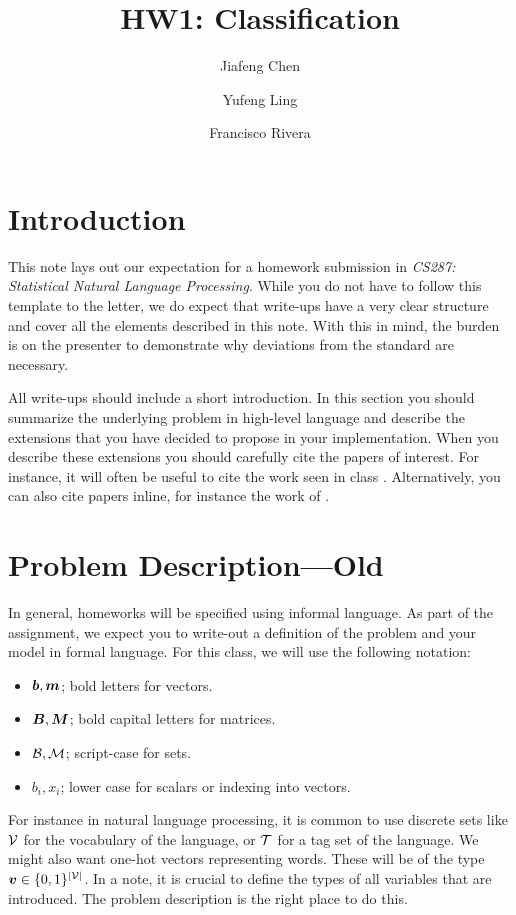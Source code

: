 \documentclass[11pt]{article}
\title{HW1: Classification}
\author{Jiafeng Chen \and Yufeng Ling \and Francisco Rivera}
\begin{document}
\maketitle{}
\section{Introduction}

This note lays out our expectation for a homework submission in
\textit{CS287: Statistical Natural Language Processing}. While you do
not have to follow this template to the letter, we do expect that
write-ups have a very clear structure and cover all the elements
described in this note. With this in mind, the burden is on the
presenter to demonstrate why deviations from the standard are
necessary.

All write-ups should include a short introduction. In this section you
should summarize the underlying problem in high-level language and
describe the extensions that you have decided to propose in your
implementation. When you describe these extensions you should
carefully cite the papers of interest. For instance, it will often be
useful to cite the work seen in class
\citep{murphy2012machine}. Alternatively, you can also cite papers
inline, for instance the work of \citet{berger1996maximum}.


\section{Problem Description---Old}

In general, homeworks will be specified using informal
language. As part of the assignment, we expect you to write-out a
definition of the problem and your model in formal language. For this
class, we will use the following notation:

\begin{itemize}
\item $\boldsymbol{b}, \boldsymbol{m}$;  bold letters for vectors.
\item $\boldsymbol{B}, \boldsymbol{M}$;  bold capital letters for matrices.
\item $\mathcal{B}, \mathcal{M}$;  script-case for sets.
\item $b_i, x_i$; lower case for scalars or indexing into vectors.
\end{itemize}


For instance in natural language processing, it is common to use
discrete sets like $\mathcal{V}$ for the vocabulary of the language, or $\mathcal{T}$ for a
tag set of the language.  We might also want one-hot vectors
representing words. These will be of the type
$\boldsymbol{v} \in \{0,1\}^{|\mathcal{V}|}$. In a note, it is crucial to define the
types of all variables that are introduced. The problem description is the
right place to do this.
\end{document}
